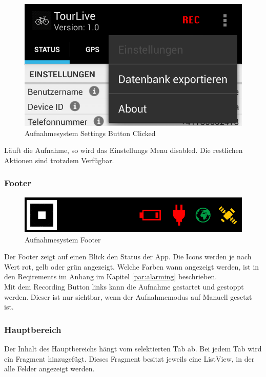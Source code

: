 \begin{figure}[H]
	\centering
	\includegraphics[width=150mm]{images/android/settingsclicked.png}
	\caption{Aufnahmesystem Settings Button Clicked}
\end{figure}

Läuft die Aufnahme, so wird das Einstellungs Menu disabled. Die restlichen Aktionen sind trotzdem Verfügbar.


\subsubsection{Footer}
\begin{figure}[H]
	\centering
	\includegraphics[width=150mm]{images/android/footer.png}
	\caption{Aufnahmesystem Footer}
\end{figure}
Der Footer zeigt auf einen Blick den Status der App. Die Icons werden je nach Wert rot, gelb oder grün angezeigt. Welche Farben wann angezeigt werden, ist in den Reqirements im Anhang im Kapitel \ref{par:alarming} beschrieben.\\
Mit dem Recording Button links kann die Aufnahme gestartet und gestoppt werden. Dieser ist nur sichtbar, wenn der Aufnahmemodus auf Manuell gesetzt ist.


\subsubsection{Hauptbereich}
Der Inhalt des Hauptbereichs hängt vom selektierten Tab ab. Bei jedem Tab wird ein Fragment hinzugefügt. Dieses Fragment besitzt jeweils eine ListView, in der alle Felder angezeigt werden. 


